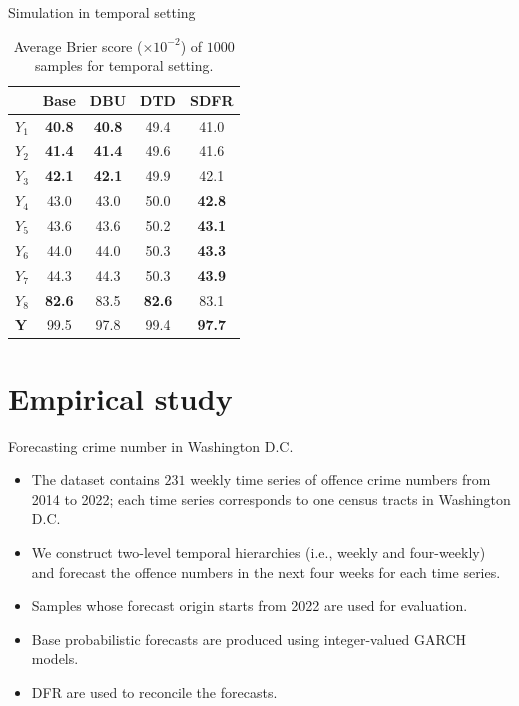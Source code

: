 \documentclass[12pt]{beamer}
\begin{document}
\begin{frame}{Simulation in temporal setting}
    \begin{table}
        \centering
        \caption{Average Brier score ($\times 10^{-2}$) of $1000$ samples for temporal setting.}
        \begin{tabular}{lcccc}
        \toprule
         & Base & DBU & DTD & SDFR \\\midrule
        $Y_1$ & \textbf{40.8} & \textbf{40.8} & 49.4 & 41.0 \\
        $Y_2$ & \textbf{41.4} & \textbf{41.4} & 49.6 & 41.6\\
        $Y_3$ & \textbf{42.1} & \textbf{42.1} & 49.9 & 42.1\\
        $Y_4$ & 43.0 & 43.0  & 50.0          & \textbf{42.8}\\
        $Y_5$ & 43.6 & 43.6  & 50.2          & \textbf{43.1} \\
        $Y_6$ & 44.0 & 44.0  & 50.3          & \textbf{43.3} \\
        $Y_7$ & 44.3 & 44.3  & 50.3          & \textbf{43.9} \\
        $Y_8$ & \textbf{82.6} & 83.5          & \textbf{82.6} & 83.1\\
        $\mathbf{Y}$ & 99.5 & 97.8  & 99.4          & \textbf{97.7} \\
        \bottomrule
        \end{tabular}
    \end{table}
\end{frame}

\section{Empirical study}

\begin{frame}{Forecasting crime number in Washington D.C.}
\begin{itemize}
    \item The dataset contains $231$ weekly time series of offence crime numbers from 2014 to 2022; each time series corresponds to one census tracts in Washington D.C.
    \item We construct two-level temporal hierarchies (i.e., weekly and four-weekly) and forecast the offence numbers in the next four weeks for each time series.
    
    \item Samples whose forecast origin starts from 2022 are used for evaluation.
    \item Base probabilistic forecasts are produced using integer-valued GARCH models.
    \item DFR are used to reconcile the forecasts.
\end{itemize}    
\end{frame}
\end{document}
